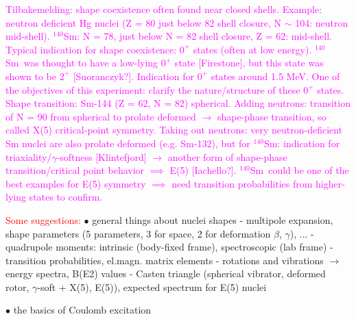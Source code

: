 \documentclass[twoside,english]{uiofysmaster/uiofysmaster}
\newcommand{\Sm}{$^{140}$Sm} %
\newcommand{\ga}{$\gamma$}
\begin{document}
\textcolor{Magenta}{Tilbakemelding: \newline 
shape coexistence often found near closed shells. Example: neutron deficient Hg nuclei (Z = 80 just below 82 shell closure, N $\sim$ 104: neutron mid-shell). \newline
\Sm: N = 78, just below N = 82 shell closure, Z = 62: mid-shell. \newline
Typical indication for shape coexistence: $0^+$ states (often at low energy). \newline 
\Sm\ was thought to have a low-lying $0^+$ state [Firestone], but this state was shown to be $2^+$ [Suoranczyk?]. Indication for $0^+$ states around 1.5 MeV. \newline 
One of the objectives of this experiment: clarify the nature/structure of these $0^+$ states. \newline 
Shape transition: Sm-144 (Z = 62, N = 82) spherical. Adding neutrons: transition of N = 90 from spherical to prolate deformed $\rightarrow$ shape-phase transition, so called X(5) critical-point symmetry. \newline
Taking out neutrons: very neutron-deficient Sm nuclei are also prolate deformed (e.g. Sm-132), but for \Sm: indication for triaxiality/\ga-softness [Klintefjord] $\rightarrow$ another form of shape-phase transition/critical point behavior $\implies$ E(5) [Iachello?]. \Sm\ could be one of the best examples for E(5) symmetry $\implies$ need transition probabilities from higher-lying states to confirm.} \newline


\textcolor{red}{Some suggestions:} \newline
$\bullet$ general things about nuclei shapes \newline
- multipole expansion, shape parameters (5 parameters, 3 for space, 2 for deformation $\beta$, \ga), ... \newline
- quadrupole moments: intrinsic (body-fixed frame), spectroscopic (lab frame)  \newline
- transition probabilities, el.magn. matrix elements  \newline
- rotations and vibrations $\rightarrow$ energy spectra, B(E2) values  \newline
- Casten triangle (spherical vibrator, deformed rotor, \ga-soft + X(5), E(5)), expected spectrum for E(5) nuclei \newline

$\bullet$ the basics of Coulomb excitation 
\end{document}
